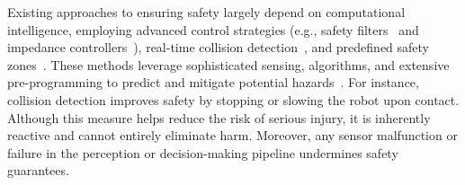 Existing approaches to ensuring safety largely depend on computational intelligence, employing advanced control strategies (e.g., safety filters~\cite{ames2016control} and impedance controllers~\cite{khatib1987unified}), real-time collision detection~\cite{haddadin2017robot}, and predefined safety zones~\cite{zhao2024potential}. These methods leverage sophisticated sensing, algorithms, and extensive pre-programming to predict and mitigate potential hazards~\cite{fragapane2021planning}. For instance, collision detection improves safety by stopping or slowing the robot upon contact. Although this measure helps reduce the risk of serious injury, it is inherently reactive and cannot entirely eliminate harm. Moreover, any sensor malfunction or failure in the perception or decision-making pipeline undermines safety guarantees.
